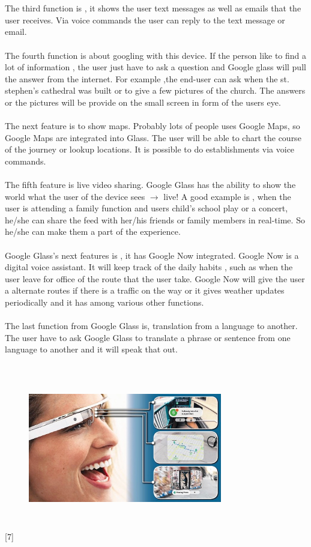 \\
\\
The third function is , it shows the user text messages as well as emails that the user receives. Via voice commands the user can reply to the text message or email.
\\
\\
The fourth function is about googling with this device. If the person like to find a lot of information , the user just have to ask a question and Google glass will pull the answer from the internet. For example ,the end-user can ask when the st. stephen's cathedral was built or to give a few pictures of the church. The answers or the pictures will be provide on the small screen in form of the users eye.
\\
\\
The next feature is to show maps. Probably lots of people uses Google Maps, so Google Maps are integrated into Glass. The user will be able to chart the course of the journey or lookup locations. It is possible to do establishments via voice commands.
\\
\\
The fifth feature is live video sharing. Google Glass has the ability to show the world what the user of the device sees $\rightarrow$ live! A good example is , when the user is attending a family function and users child’s school play or a concert, he/she can share the feed with her/his friends or family members in real-time. So he/she can make them a part of the experience.
\\
\\
Google Glass’s next features is , it has Google Now integrated. Google Now is a digital voice assistant. It will keep track of the daily habits , such as when the user leave for office of the route that the user take.  Google Now  will give the user a alternate routes if there is a traffic on the way or it gives weather updates periodically and it has among various other functions.
\\
\\
The last function from  Google Glass is, translation from a language to another. The user have to ask Google Glass to translate a phrase or sentence from one language to another and it will speak that out.
\\
\\
\begin{figure}[htbp]
\centering
\includegraphics[width=240pt,height=180pt,keepaspectratio]{graphics/googlefunctions.png}
\caption{\cite{javaObjectClass}}
\end{figure}
[7]
